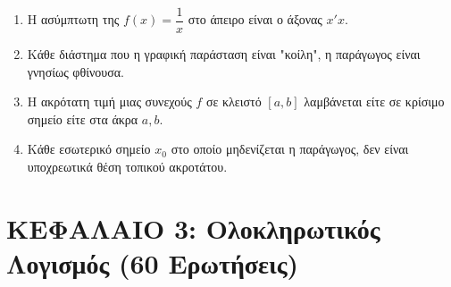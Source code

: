 \documentclass[11pt,a4paper]{article}
\begin{document}
\begin{enumerate}[label=\textbf{2.\arabic*.}]
    \item H ασύμπτωτη της $f(x)=\dfrac{1}{x}$ στο άπειρο είναι ο άξονας $x'x$.
    \item Κάθε διάστημα που η γραφική παράσταση είναι "κοίλη", η παράγωγος είναι γνησίως φθίνουσα.
    \item Η ακρότατη τιμή μιας συνεχούς $f$ σε κλειστό $[a,b]$ λαμβάνεται είτε σε κρίσιμο σημείο είτε στα άκρα $a, b$.
    \item Κάθε εσωτερικό σημείο $x_0$ στο οποίο μηδενίζεται η παράγωγος, δεν είναι υποχρεωτικά θέση τοπικού ακροτάτου.
\end{enumerate}

\section*{ΚΕΦΑΛΑΙΟ 3: Ολοκληρωτικός Λογισμός (60 Ερωτήσεις)}
\end{document}
